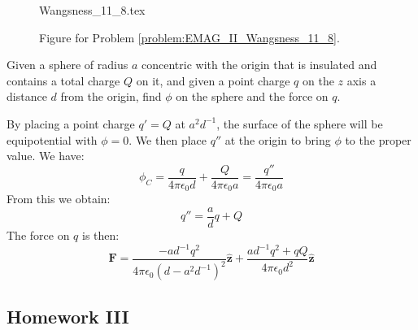 \documentclass[crop=false,class=book,oneside]{standalone}
\begin{document}
            \begin{figure}[H]
                \centering
                \captionsetup{type=figure}
                {Wangsness_11_8.tex}
                \caption{Figure for Problem
                         \ref{problem:EMAG_II_Wangsness_11_8}.}
                \label{fig:EMAG_II_Wangsness_11_8}
            \end{figure}
            \begin{problem}
                Given a sphere of radius $a$ concentric with the
                origin that is insulated and contains a total charge
                $Q$ on it, and given a point charge $q$ on the
                $z$ axis a distance $d$ from the origin, find
                $\phi$ on the sphere and the force on $q$.
            \end{problem}
            \begin{solution}
                By placing a point charge $q'=Q$ at
                $a^{2}d^{\minus{1}}$, the surface of the sphere
                will be equipotential with $\phi=0$. We then place
                $q''$ at the origin to bring $\phi$ to the proper
                value. We have:
                \begin{equation}
                    \phi_{C}=\frac{q}{4\pi\epsilon_{0}d}+
                        \frac{Q}{4\pi\epsilon_{0}a}
                    =\frac{q''}{4\pi\epsilon_{0}a}
                \end{equation}
                From this we obtain:
                \begin{equation}
                    q''=\frac{a}{d}q+Q
                \end{equation}
                The force on $q$ is then:
                \begin{equation}
                    \mathbf{F}=
                    \frac{\minus{a}d^{\minus{1}}q^{2}}
                        {4\pi\epsilon_{0}(d-a^{2}d^{\minus{1}})^{2}}
                    \hat{\mathbf{z}}+
                    \frac{ad^{\minus{1}}q^{2}+qQ}
                        {4\pi\epsilon_{0}d^{2}}
                    \hat{\mathbf{z}}
                \end{equation}
            \end{solution}
        \subsection{Homework III}
            \begin{problem}
                
            \end{problem}
\end{document}
